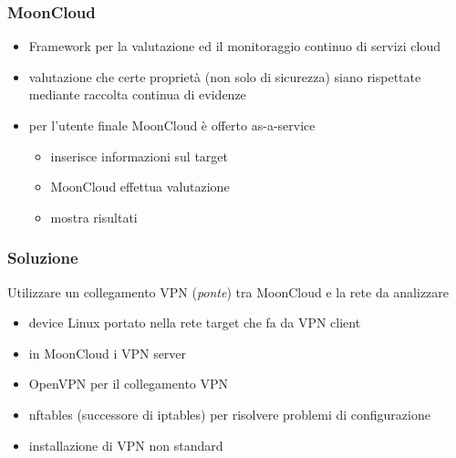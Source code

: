 \begin{frame}
	\frametitle{MoonCloud}
	\begin{itemize}
		\item Framework per la \alert{valutazione}
		      ed il \alert{monitoraggio continuo} di servizi
		      cloud
		\item valutazione che certe proprietà (non solo di sicurezza)
		      siano rispettate
		      mediante \alert{raccolta continua di evidenze}
		\item per l'utente finale MoonCloud è offerto \alert{as-a-service}
		      \begin{itemize}
		      	\item inserisce informazioni sul target
		      	\item MoonCloud effettua valutazione
		      	\item mostra risultati
		      \end{itemize}
	\end{itemize}
\end{frame}

\begin{frame}
	\frametitle{Soluzione}
	Utilizzare un collegamento \alert{VPN} (\textit{ponte}) tra MoonCloud e
	la rete da analizzare
		    
	\begin{itemize}
		\item device \alert{Linux} portato nella rete target che fa da VPN client
		\item in MoonCloud i \alert{VPN server}
		\item \alert{OpenVPN} per il collegamento VPN 
		\item \alert{nftables} (successore
		      di \alert{iptables}) per risolvere problemi di configurazione
		      		      		      
	\end{itemize}
		    
	\begin{itemize}
		\item installazione di \alert{VPN non standard} 
	\end{itemize}
\end{frame}

